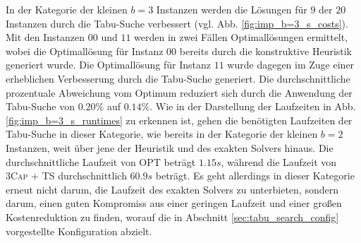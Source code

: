 \vfill
\pagebreak

In der Kategorie der kleinen $b = 3$ Instanzen werden die Lösungen für $9$ der $20$ Instanzen durch
die Tabu-Suche verbessert (vgl. Abb. \ref{fig:imp_b=3_s_costs}).
Mit den Instanzen $00$ und $11$ werden in zwei Fällen Optimallösungen ermittelt, wobei die Optimallösung
für Instanz $00$ bereits durch die konstruktive Heuristik generiert wurde. Die Optimallösung für Instanz $11$
wurde dagegen im Zuge einer erheblichen Verbesserung durch die Tabu-Suche generiert.
Die durchschnittliche prozentuale Abweichung vom Optimum reduziert sich durch die Anwendung der Tabu-Suche
von $0.20 \%$ auf $0.14 \%$.
Wie in der Darstellung der Laufzeiten in Abb. \ref{fig:imp_b=3_s_runtimes} zu erkennen ist, gehen die benötigten Laufzeiten der Tabu-Suche in dieser Kategorie, wie bereits in der Kategorie der kleinen $b = 2$ Instanzen,
weit über jene der Heuristik und des exakten Solvers hinaus.
Die durchschnittliche Laufzeit von \textsc{OPT} beträgt $1.15s$, während die Laufzeit von \textsc{3Cap + TS} durchschnittlich $60.9s$ beträgt. Es geht allerdings in dieser Kategorie erneut nicht darum, die Laufzeit des exakten
Solvers zu unterbieten, sondern darum, einen guten Kompromiss aus einer geringen Laufzeit und einer großen Kostenreduktion zu finden, worauf die in Abschnitt \ref{sec:tabu_search_config} vorgestellte Konfiguration
abzielt.

